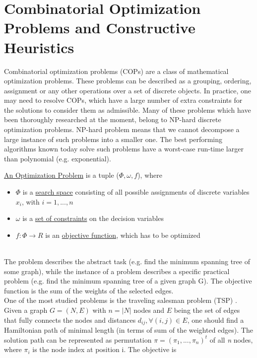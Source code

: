 \section{Combinatorial Optimization Problems and Constructive
Heuristics}

Combinatorial optimization problems (COPs) are a class of mathematical optimization problems. These problems can be described as a grouping, ordering, assignment or any other operations over a set of discrete objects. In practice, one may need to resolve COPs, which have a large number of extra constraints for the solutions to consider them as admissible. Many of these problems which have been thoroughly researched at the moment, belong to NP-hard discrete optimization problems. NP-hard problem means that we cannot decompose a large instance of such problems into a smaller one. The best performing algorithms known today solve such problems have a worst-case run-time larger than polynomial (e.g. exponential).

\begin{minipage}[c, breaklines=true]{0.95\textwidth}
\begin{definition}
	\underline{An Optimization Problem} is a tuple \cite{comb_opt} ($\Phi,\omega, f$), where
	\begin{itemize}
		\item{$\Phi$ is a \underline{search space} consisting of all possible assignments of discrete variables $x_i$, with $i=1,...,n$ }
		\item{$\omega$ is a \underline{set of constraints} on the decision variables}
		\item{$f:\Phi \to R$ is an \underline{objective function}, which has to be optimized}
	\end{itemize}
\end{definition}
\end{minipage} \\

The problem describes the abstract task (e.g. find the minimum spanning tree of some graph), while the instance of a problem describes a specific practical problem (e.g. find the minimum spanning tree of a given graph G). The objective function is the sum of the weights of the selected edges. \\
One of the most studied problems is the traveling salesman problem (TSP) \cite{aco_overview}. Given a graph $G=(N,E)$ with $n=|N|$ nodes and $E$ being the set of edges that fully connects the nodes and distances $d_{ij}, \forall(i,j) \in E$, one should find a Hamiltonian path of minimal length (in terms of sum of the weighted edges). The solution path can be represented as permutation $\pi=(\pi_1,...,\pi_n)^t$ of all \emph{n} nodes, where $\pi_i$ is the node index at position i. The objective is

